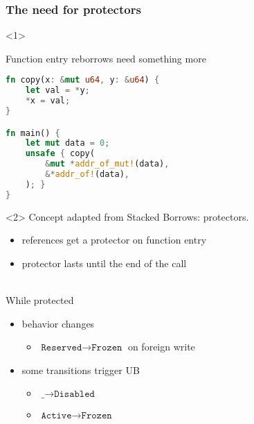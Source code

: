 \begin{frame}[fragile]
    \frametitle{The need for protectors}
    \begin{onlyenv}<1>
        \begin{block}{Function entry reborrows need something more}
            \begin{lstlisting}[language=rust]
fn copy(x: &mut u64, y: &u64) {
    let val = *y;
    *x = val;
}

fn main() {
    let mut data = 0;
    unsafe { copy(
        &mut *addr_of_mut!(data),
        &*addr_of!(data),
    ); }
}
            \end{lstlisting}
        \end{block}
    \end{onlyenv}

    \begin{onlyenv}<2>
        Concept adapted from Stacked Borrows: protectors.
        \begin{itemize}
            \item references get a protector on function entry
            \item protector lasts until the end of the call
        \end{itemize}
        ~\\
        While protected
        \begin{itemize}
            \item behavior changes
                \begin{itemize}
                    \item \(\texttt{Reserved} \to \texttt{Frozen}\) on foreign write
                \end{itemize}
            \item some transitions trigger UB
                \begin{itemize}
                    \item \(\texttt{\_} \to \texttt{Disabled}\)
                    \item \(\texttt{Active} \to \texttt{Frozen}\)
                \end{itemize}
        \end{itemize}
    \end{onlyenv}
\end{frame}

